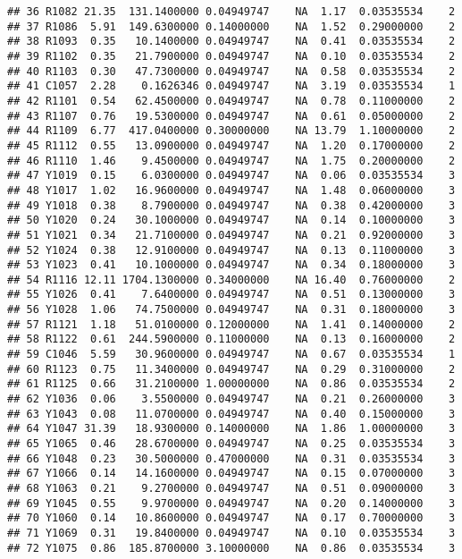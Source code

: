 \documentclass[]{article}
\begin{document}
\begin{verbatim}
## 36 R1082 21.35  131.1400000 0.04949747    NA  1.17  0.03535534    2
## 37 R1086  5.91  149.6300000 0.14000000    NA  1.52  0.29000000    2
## 38 R1093  0.35   10.1400000 0.04949747    NA  0.41  0.03535534    2
## 39 R1102  0.35   21.7900000 0.04949747    NA  0.10  0.03535534    2
## 40 R1103  0.30   47.7300000 0.04949747    NA  0.58  0.03535534    2
## 41 C1057  2.28    0.1626346 0.04949747    NA  3.19  0.03535534    1
## 42 R1101  0.54   62.4500000 0.04949747    NA  0.78  0.11000000    2
## 43 R1107  0.76   19.5300000 0.04949747    NA  0.61  0.05000000    2
## 44 R1109  6.77  417.0400000 0.30000000    NA 13.79  1.10000000    2
## 45 R1112  0.55   13.0900000 0.04949747    NA  1.20  0.17000000    2
## 46 R1110  1.46    9.4500000 0.04949747    NA  1.75  0.20000000    2
## 47 Y1019  0.15    6.0300000 0.04949747    NA  0.06  0.03535534    3
## 48 Y1017  1.02   16.9600000 0.04949747    NA  1.48  0.06000000    3
## 49 Y1018  0.38    8.7900000 0.04949747    NA  0.38  0.42000000    3
## 50 Y1020  0.24   30.1000000 0.04949747    NA  0.14  0.10000000    3
## 51 Y1021  0.34   21.7100000 0.04949747    NA  0.21  0.92000000    3
## 52 Y1024  0.38   12.9100000 0.04949747    NA  0.13  0.11000000    3
## 53 Y1023  0.41   10.1000000 0.04949747    NA  0.34  0.18000000    3
## 54 R1116 12.11 1704.1300000 0.34000000    NA 16.40  0.76000000    2
## 55 Y1026  0.41    7.6400000 0.04949747    NA  0.51  0.13000000    3
## 56 Y1028  1.06   74.7500000 0.04949747    NA  0.31  0.18000000    3
## 57 R1121  1.18   51.0100000 0.12000000    NA  1.41  0.14000000    2
## 58 R1122  0.61  244.5900000 0.11000000    NA  0.13  0.16000000    2
## 59 C1046  5.59   30.9600000 0.04949747    NA  0.67  0.03535534    1
## 60 R1123  0.75   11.3400000 0.04949747    NA  0.29  0.31000000    2
## 61 R1125  0.66   31.2100000 1.00000000    NA  0.86  0.03535534    2
## 62 Y1036  0.06    3.5500000 0.04949747    NA  0.21  0.26000000    3
## 63 Y1043  0.08   11.0700000 0.04949747    NA  0.40  0.15000000    3
## 64 Y1047 31.39   18.9300000 0.14000000    NA  1.86  1.00000000    3
## 65 Y1065  0.46   28.6700000 0.04949747    NA  0.25  0.03535534    3
## 66 Y1048  0.23   30.5000000 0.47000000    NA  0.31  0.03535534    3
## 67 Y1066  0.14   14.1600000 0.04949747    NA  0.15  0.07000000    3
## 68 Y1063  0.21    9.2700000 0.04949747    NA  0.51  0.09000000    3
## 69 Y1045  0.55    9.9700000 0.04949747    NA  0.20  0.14000000    3
## 70 Y1060  0.14   10.8600000 0.04949747    NA  0.17  0.70000000    3
## 71 Y1069  0.31   19.8400000 0.04949747    NA  0.10  0.03535534    3
## 72 Y1075  0.86  185.8700000 3.10000000    NA  0.86  0.03535534    3

\end{verbatim}
\end{document}
